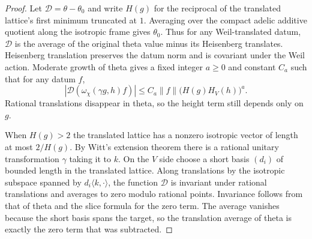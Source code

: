 \begin{proof}
Let $\mathcal D=\theta-\theta_0$ and write $H(g)$ for the reciprocal of the translated lattice's first minimum truncated at $1$. Averaging over the compact adelic additive quotient along the isotropic frame gives $\theta_0$. Thus for any Weil-translated datum, $\mathcal D$ is the average of the original theta value minus its Heisenberg translates. Heisenberg translation preserves the datum norm and is covariant under the Weil action. Moderate growth of theta gives a fixed integer $a\ge0$ and constant $C_a$ such that for any datum $f$,
\[
 |\mathcal D(\omega_\chi(\gamma g,h)f)|
   \le C_a\|f\|\bigl(H(g)H_V(h)\bigr)^a .
\]
Rational translations disappear in theta, so the height term still depends only on $g$.

When $H(g)>2$ the translated lattice has a nonzero isotropic vector of length at most $2/H(g)$. By Witt's extension theorem there is a rational unitary transformation $\gamma$ taking it to $k$. On the $V$ side choose a short basis $(d_i)$ of bounded length in the translated lattice. Along translations by the isotropic subspace spanned by $d_i\langle k,\cdot\rangle$, the function $\mathcal D$ is invariant under rational translations and averages to zero modulo rational points. Invariance follows from that of theta and the slice formula for the zero term. The average vanishes because the short basis spans the target, so the translation average of theta is exactly the zero term that was subtracted.


\end{proof}
